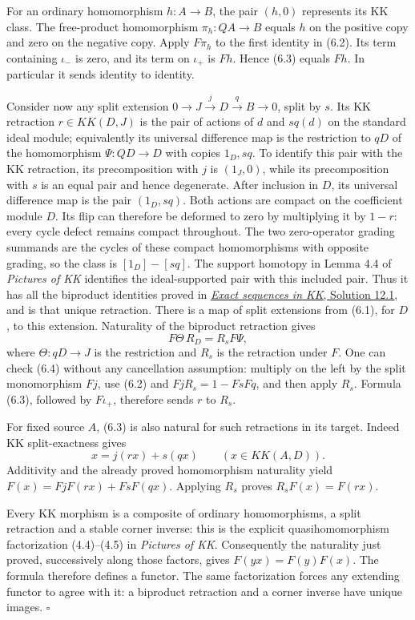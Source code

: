 \documentclass[
  11pt,
]{article}
\begin{document}
For an ordinary homomorphism \(h:A\to B\), the pair \((h,0)\) represents
its KK class. The free-product homomorphism \(\pi_h:QA\to B\) equals
\(h\) on the positive copy and zero on the negative copy. Apply
\(F\pi_h\) to the first identity in (6.2). Its term containing
\(\iota_-\) is zero, and its term on \(\iota_+\) is \(Fh\). Hence (6.3)
equals \(Fh\). In particular it sends identity to identity.

Consider now any split extension
\(0\to J\xrightarrow{j}D\xrightarrow{q}B\to0\), split by \(s\). Its KK
retraction \(r\in KK(D,J)\) is the pair of actions of \(d\) and
\(sq(d)\) on the standard ideal module; equivalently its universal
difference map is the restriction to \(qD\) of the homomorphism
\(\Psi:QD\to D\) with copies \(1_D,sq\). To identify this pair with the
KK retraction, its precomposition with \(j\) is \((1_J,0)\), while its
precomposition with \(s\) is an equal pair and hence degenerate. After
inclusion in \(D\), its universal difference map is the pair
\((1_D,sq)\). Both actions are compact on the coefficient module \(D\).
Its flip can therefore be deformed to zero by multiplying it by \(1-r\):
every cycle defect remains compact throughout. The two zero-operator
grading summands are the cycles of these compact homomorphisms with
opposite grading, so the class is \([1_D]-[sq]\). The support homotopy
in Lemma 4.4 of \emph{Pictures of KK} identifies the ideal-supported
pair with this included pair. Thus it has all the biproduct identities
proved in \href{KT-KK-14.html\#13-solutions}{\emph{Exact sequences in
KK}, Solution 12.1}, and is that unique retraction. There is a map of
split extensions from (6.1), for \(D\), to this extension. Naturality of
the biproduct retraction gives \[
F\Theta\,R_D=R_sF\Psi,
\tag{6.4}
\] where \(\Theta:qD\to J\) is the restriction and \(R_s\) is the
retraction under \(F\). One can check (6.4) without any cancellation
assumption: multiply on the left by the split monomorphism \(Fj\), use
(6.2) and \(FjR_s=1-FsFq\), and then apply \(R_s\). Formula (6.3),
followed by \(F\iota_+\), therefore sends \(r\) to \(R_s\).

For fixed source \(A\), (6.3) is also natural for such retractions in
its target. Indeed KK split-exactness gives \[
x=j(rx)+s(qx)\qquad(x\in KK(A,D)).
\tag{6.5}
\] Additivity and the already proved homomorphism naturality yield
\(F(x)=FjF(rx)+FsF(qx)\). Applying \(R_s\) proves \(R_sF(x)=F(rx)\).

Every KK morphism is a composite of ordinary homomorphisms, a split
retraction and a stable corner inverse: this is the explicit
quasihomomorphism factorization (4.4)--(4.5) in \emph{Pictures of KK}.
Consequently the naturality just proved, successively along those
factors, gives \(F(yx)=F(y)F(x)\). The formula therefore defines a
functor. The same factorization forces any extending functor to agree
with it: a biproduct retraction and a corner inverse have unique images.
\(\square\)
\end{document}
